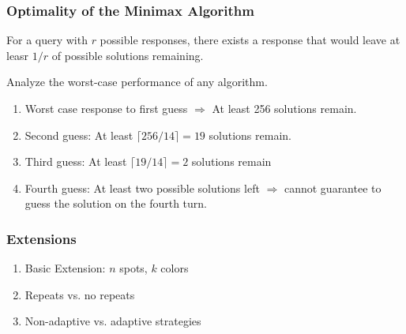 \documentclass{beamer}
\begin{document}
    \begin{frame}
    	\frametitle{Optimality of the Minimax Algorithm}
	\begin{tcolorbox}[colback=blue!5,colframe=blue!40!black,title=Lemma (Pigeonhole Principle)]
	For a query with $r$ possible responses, there exists a response that would leave at leasr $1/r$ of possible solutions remaining.
	\end{tcolorbox}
	Analyze the worst-case performance of any algorithm. \\
		\begin{enumerate}[label=\roman*.]
		\item Worst case response to first guess $\Rightarrow$ At least 256 solutions remain.
		\item Second guess:  At least $\lceil 256/14 \rceil = 19$ solutions remain.
		\item Third guess: At least $\lceil 19/14 \rceil = 2$ solutions remain
		\item Fourth guess: At least two possible solutions left $\Rightarrow$ cannot guarantee to guess the solution on the fourth turn.
		\end{enumerate}
    \end{frame}

    \begin{frame}
    	\frametitle{Extensions}
		\begin{enumerate}[label=\roman*.]
		\item Basic Extension: $n$ spots, $k$ colors
		\item Repeats vs. no repeats
		\item Non-adaptive vs. adaptive strategies
		\end{enumerate}
    \end{frame}
    
\end{document}
